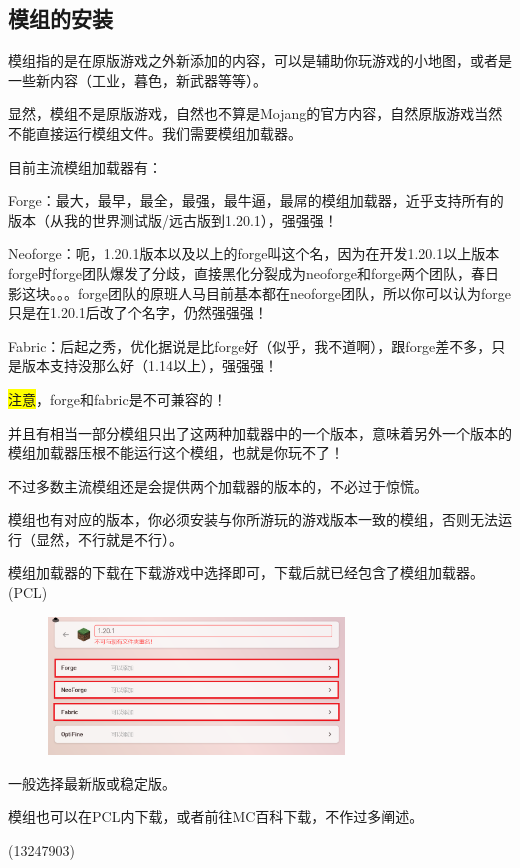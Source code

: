 \documentclass[UTF8,a4paper]{article}
\begin{document}
		\subsection{模组的安装}
			\hypertarget{modsinstall}{}
			\par 模组指的是在原版游戏之外新添加的内容，可以是辅助你玩游戏的小地图，或者是一些新内容（工业，暮色，新武器等等）。
			\par 显然，模组不是原版游戏，自然也不算是Mojang的官方内容，自然原版游戏当然不能直接运行模组文件。我们需要模组加载器。
			\par 目前主流模组加载器有：
			\par Forge：最大，最早，最全，最强，最牛逼，最屌的模组加载器，近乎支持所有的版本（从我的世界测试版/远古版到1.20.1），强强强！
			\par Neoforge：呃，1.20.1版本以及以上的forge叫这个名，因为在开发1.20.1以上版本forge时forge团队爆发了分歧，直接黑化分裂成为neoforge和forge两个团队，春日影这块。。。forge团队的原班人马目前基本都在neoforge团队，所以你可以认为forge只是在1.20.1后改了个名字，仍然强强强！
			\par Fabric：后起之秀，优化据说是比forge好（似乎，我不道啊），跟forge差不多，只是版本支持没那么好（1.14以上），强强强！
			\par \colorbox{yellow}{注意}，forge和fabric是不可兼容的！
			\par 并且有相当一部分模组只出了这两种加载器中的一个版本，意味着另外一个版本的模组加载器压根不能运行这个模组，也就是你玩不了！
			\par 不过多数主流模组还是会提供两个加载器的版本的，不必过于惊慌。
			\par 模组也有对应的版本，你必须安装与你所游玩的游戏版本一致的模组，否则无法运行（显然，不行就是不行）。
			\par 模组加载器的下载在下载游戏中选择即可，下载后就已经包含了模组加载器。(PCL)
			\begin{figure}[H] %
				\centering %
				\includegraphics[width=0.7\textwidth]{./Pictures/PCL_2.png} %
			\end{figure}
			\par 一般选择最新版或稳定版。
			\par 模组也可以在PCL内下载，或者前往MC百科下载，不作过多阐述。
			\begin{flushright}(13247903)\end{flushright}
\end{document}
